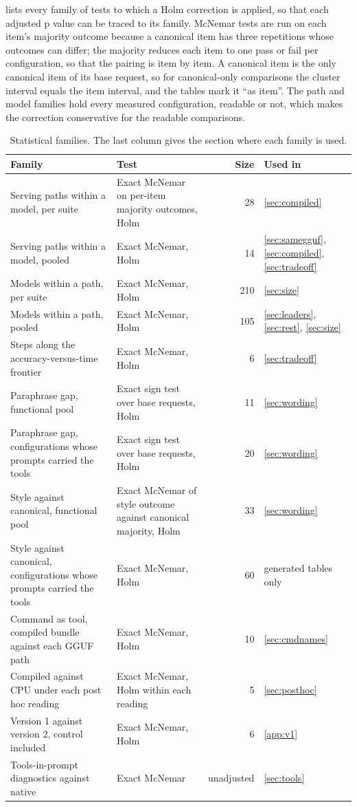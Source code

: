 \documentclass[11pt]{article}
\begin{document}
 lists every family of tests to which a Holm correction is applied, so that each adjusted p value can be traced to its family. McNemar tests are run on each item's majority outcome because a canonical item has three repetitions whose outcomes can differ; the majority reduces each item to one pass or fail per configuration, so that the pairing is item by item. A canonical item is the only canonical item of its base request, so for canonical-only comparisons the cluster interval equals the item interval, and the tables mark it ``as item''. The path and model families hold every measured configuration, readable or not, which makes the correction conservative for the readable comparisons.

\begin{table}[tbp]
\centering
\caption{Statistical families. The last column gives the section where each family is used.}
\label{tab:families}
\small
\begin{tabularx}{\linewidth}{@{}LLrl@{}}
\toprule
Family & Test & Size & Used in \\
\midrule
Serving paths within a model, per suite & Exact McNemar on per-item majority outcomes, Holm & 28 & \ref{sec:compiled} \\
Serving paths within a model, pooled & Exact McNemar, Holm & 14 & \ref{sec:samegguf}, \ref{sec:compiled}, \ref{sec:tradeoff} \\
Models within a path, per suite & Exact McNemar, Holm & 210 & \ref{sec:size} \\
Models within a path, pooled & Exact McNemar, Holm & 105 & \ref{sec:leaders}, \ref{sec:rest}, \ref{sec:size} \\
Steps along the accuracy-versus-time frontier & Exact McNemar, Holm & 6 & \ref{sec:tradeoff} \\
Paraphrase gap, functional pool & Exact sign test over base requests, Holm & 11 & \ref{sec:wording} \\
Paraphrase gap, configurations whose prompts carried the tools & Exact sign test over base requests, Holm & 20 & \ref{sec:wording} \\
Style against canonical, functional pool & Exact McNemar of style outcome against canonical majority, Holm & 33 & \ref{sec:wording} \\
Style against canonical, configurations whose prompts carried the tools & Exact McNemar, Holm & 60 & generated tables only \\
Command as tool, compiled bundle against each GGUF path & Exact McNemar, Holm & 10 & \ref{sec:cmdnames} \\
Compiled against CPU under each post hoc reading & Exact McNemar, Holm within each reading & 5 & \ref{sec:posthoc} \\
Version 1 against version 2, control included & Exact McNemar, Holm & 6 & \ref{app:v1} \\
Tools-in-prompt diagnostics against native & Exact McNemar & unadjusted & \ref{sec:tools} \\
\bottomrule
\end{tabularx}
\end{table}
\end{document}

